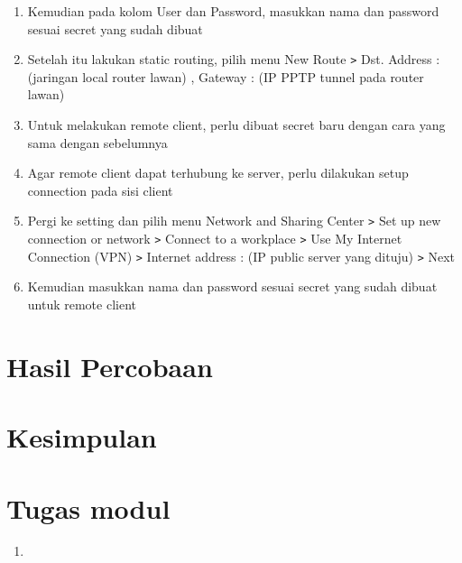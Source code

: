 \begin{enumerate}
    \item Kemudian pada kolom User dan Password, masukkan nama dan password sesuai secret yang sudah dibuat
    \item Setelah itu lakukan static routing, pilih menu New Route \texttt{\text>} Dst. Address : (jaringan local router lawan) , Gateway : (IP PPTP tunnel pada router lawan)
    \item Untuk melakukan remote client, perlu dibuat secret baru dengan cara yang sama dengan sebelumnya
    \item Agar remote client dapat terhubung ke server, perlu dilakukan setup connection pada sisi client
    \item Pergi ke setting dan pilih menu Network and Sharing Center \texttt{\text>} Set up new connection or network \texttt{\text>} Connect to a workplace \texttt{\text>} Use My Internet Connection (VPN) \texttt{\text>} Internet address : (IP public server yang dituju) \texttt{\text>} Next
    \item Kemudian masukkan nama dan password sesuai secret yang sudah dibuat untuk remote client
    
\end{enumerate}

\section{Hasil Percobaan}


\section{Kesimpulan}


\section{Tugas modul}

\begin{enumerate}
    \item 
\end{enumerate}